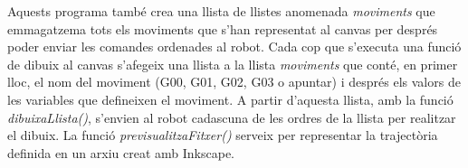 Aquests programa també crea una llista de llistes anomenada \emph{moviments} que emmagatzema tots els moviments que s'han representat al canvas per després poder enviar les comandes ordenades al robot. Cada cop que s'executa una funció de dibuix al canvas s'afegeix una llista a la llista \emph{moviments} que conté, en primer lloc, el nom del moviment (G00, G01, G02, G03 o apuntar) i després els valors de les variables que defineixen el moviment. A partir d'aquesta llista, amb la funció \emph{dibuixaLlista()}, s'envien al robot cadascuna de les ordres de la llista per realitzar el dibuix. La funció \emph{previsualitzaFitxer()} serveix per representar la trajectòria definida en un arxiu creat amb Inkscape. 





  

